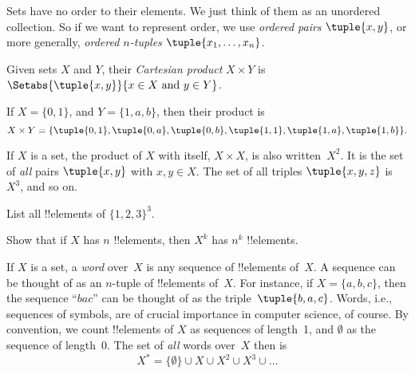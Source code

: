 \documentclass[../../../include/open-logic-section]{subfiles}
\begin{document}

\begin{explain}
Sets have no order to their elements. We just think of them as an
unordered collection. So if we want to represent order, we use
\emph{ordered pairs} $\tuple{x, y}$, or more generally,
\emph{ordered $n$-tuples} $\tuple{x_1, \dots, x_n}$.
\end{explain}

\begin{defn}
Given sets $X$ and $Y$, their \emph{Cartesian product} $X \times Y$ is
$\Setabs{\tuple{x, y}}{x \in X \text{ and } y \in Y}$.
\end{defn}

\begin{ex}
If $X = \{0, 1\}$, and $Y = \{1, a, b\}$, then their product is
\[
X \times Y = \{ \tuple{0, 1}, \tuple{0, a}, \tuple{0, b},
    \tuple{1, 1}, \tuple{1, a}, \tuple{1, b} \}.
\]
\end{ex}

\begin{ex}
If $X$ is a set, the product of $X$ with itself, $X \times X$, is also
written~$X^2$. It is the set of \emph{all} pairs $\tuple{x, y}$ with
$x, y \in X$. The set of all triples $\tuple{x, y, z}$ is $X^3$, and
so on.
\end{ex}

\begin{prob}
List all !!{element}s of $\{1, 2, 3\}^3$.
\end{prob}

\begin{prob}
Show that if $X$ has $n$ !!{element}s, then $X^k$ has $n^k$
!!{element}s.
\end{prob}

\begin{ex}
If $X$ is a set, a \emph{word} over~$X$ is any sequence of
!!{element}s of~$X$. A sequence can be thought of as an $n$-tuple of
!!{element}s of~$X$. For instance, if $X = \{a, b, c\}$, then the
sequence ``$bac$'' can be thought of as the triple~$\tuple{b, a, c}$.
Words, i.e., sequences of symbols, are of crucial importance in
computer science, of course. By convention, we count !!{element}s of
$X$ as sequences of length~1, and $\emptyset$ as the sequence of
length~0. The set of \emph{all} words over~$X$ then is
\[
X^* = \{\emptyset\} \cup X \cup X^2 \cup X^3 \cup \dots
\]
\end{ex}
\end{document}
